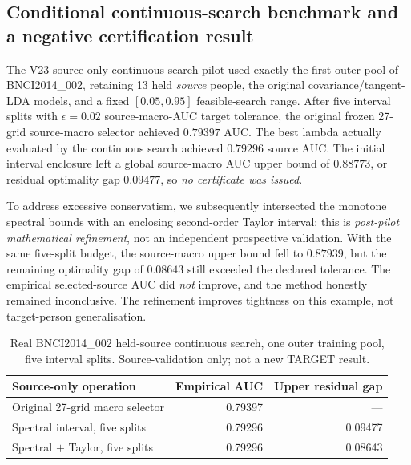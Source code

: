 \subsection{Conditional continuous-search benchmark and a negative certification result}
\label{sec:v23-source-search-pilot}
The V23 source-only continuous-search pilot used exactly the
first outer pool of BNCI2014\_002, retaining 13 held
\emph{source} people, the original covariance/tangent-LDA
models, and a fixed $[0.05,0.95]$ feasible-search range.
After five interval splits with
$\epsilon=0.02$ source-macro-AUC target tolerance,
the original frozen 27-grid source-macro selector achieved
$0.79397$ AUC. The best lambda actually evaluated by
the continuous search achieved $0.79296$ source AUC.
The initial interval enclosure left a global source-macro
AUC upper bound of $0.88773$, or residual optimality
gap $0.09477$, so \emph{no certificate was issued}.

To address excessive conservatism, we subsequently
intersected the monotone spectral bounds with an
enclosing second-order Taylor interval; this is
\emph{post-pilot mathematical refinement}, not an
independent prospective validation. With the same
five-split budget, the source-macro upper bound fell
to $0.87939$, but the remaining optimality gap of
$0.08643$ still exceeded the declared tolerance.
The empirical selected-source AUC did \emph{not}
improve, and the method honestly remained inconclusive.
The refinement improves tightness on this example,
not target-person generalisation.

\begin{table}[tb]
\centering\small
\caption{Real BNCI2014\_002 held-source continuous search,
one outer training pool, five interval splits.
Source-validation only; not a new TARGET result.}
\label{tab:v23-source-search}
\begin{tabular}{lrr}
\toprule
Source-only operation & Empirical AUC & Upper residual gap\\
\midrule
Original 27-grid macro selector & 0.79397 & ---\\
Spectral interval, five splits & 0.79296 & 0.09477\\
Spectral $+$ Taylor, five splits & 0.79296 & 0.08643\\
\bottomrule
\end{tabular}
\end{table}

